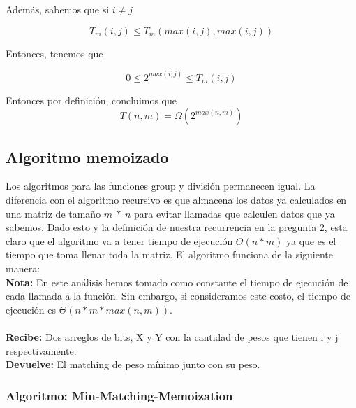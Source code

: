 \documentclass[12pt]{article}
\begin{document}
\noindent Además, sabemos que si $i\neq j$

$$T_m(i,j) \leq T_m(max(i,j),max(i,j))$$

\noindent Entonces, tenemos que

$$0\leq 2^{max(i,j)} \leq T_m(i,j) $$

\noindent Entonces por definición, concluimos que $$T(n,m) =  \Omega(2^{max(n,m)})$$

\subsection*{Algoritmo memoizado}

\noindent Los algoritmos para las funciones group y división permanecen igual. La diferencia con el algoritmo 
recursivo es que almacena los datos ya calculados en una matriz de tamaño $m\ *\ n$ para evitar llamadas que 
calculen datos que ya sabemos. Dado esto y la definición de nuestra recurrencia en la pregunta 2, esta claro que el 
algoritmo va a tener tiempo de ejecución $\Theta(n*m)$ ya que es el tiempo que toma llenar toda la matriz. El algoritmo 
funciona de la siguiente manera:\\

\noindent \textbf{Nota:} En este análisis hemos tomado como constante el tiempo de ejecución de cada llamada a la función. Sin embargo, si consideramos este costo, el tiempo de ejecución es $\Theta(n*m*max(n,m))$. \\
\\\textbf{Recibe:} Dos arreglos de bits, X y Y con la cantidad de pesos que tienen i y j respectivamente.
\\\textbf{Devuelve:} El matching de peso mínimo junto con su peso.

\subsubsection*{Algoritmo: Min-Matching-Memoization}
\end{document}
